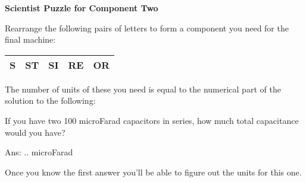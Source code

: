 \documentclass[white]{guildcamp3}
\begin{document}
\name{\wSciPuzzleTwo{}} %

\large\textbf{Scientist Puzzle for Component Two}  

Rearrange the following pairs of letters to form a component you need for the final machine:

\begin{tabular}{|c|c|c|c|c|}
	\hline \rule[-2ex]{0pt}{5.5ex} S & ST & SI & RE & OR \\ 
	\hline 
\end{tabular} 

The number of units of these you need is equal to the numerical part of the solution to the following:

If you have two 100 microFarad capacitors in series, how much total capacitance would you have?

Ans: .. microFarad


Once you know the first answer you'll be able to figure out the units for this one. 
\end{document}

